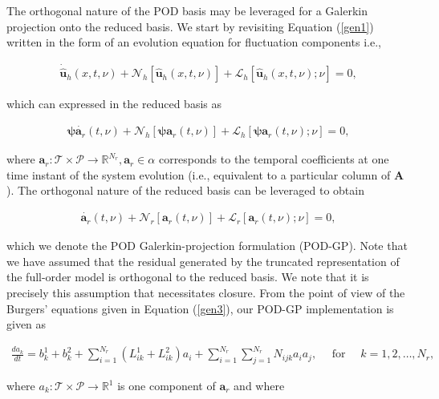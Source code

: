 \documentclass[preprint,12pt]{elsarticle}
\begin{document}
The orthogonal nature of the POD basis may be leveraged for a Galerkin projection onto the reduced basis. We start by revisiting Equation (\ref{gen1}) written in the form of an evolution equation for fluctuation components i.e.,
\begin{linenomath*}
\begin{align}
\dot{\hat{\mathbf{u}}}_h(x,t,\nu) + \mathcal{N}_h[\hat{\mathbf{u}}_h(x,t,\nu)] + \mathcal{L}_h[\hat{\mathbf{u}}_h(x,t,\nu); \nu] = 0,
\end{align}
\end{linenomath*}
which can expressed in the reduced basis as 
\begin{linenomath*}
\begin{align}
\boldsymbol{\psi} \dot{\mathbf{a}_r}(t,\nu) + \mathcal{N}_h[\boldsymbol{\psi} \mathbf{a}_r(t,\nu)] + \mathcal{L}_h[\boldsymbol{\psi} \mathbf{a}_r(t,\nu); \nu] = 0,
\end{align}
\end{linenomath*}
where $\mathbf{a}_r : \mathcal{T} \times \mathcal{P} \rightarrow \mathbb{R}^{N_r}, \mathbf{a}_r  \in \alpha$ corresponds to the temporal coefficients at one time instant of the system evolution (i.e., equivalent to a particular column of $\mathbf{A}$). The orthogonal nature of the reduced basis can be leveraged to obtain
\begin{linenomath*}
\begin{align}
\dot{\mathbf{a}_r}(t,\nu) + \mathcal{N}_r[\mathbf{a}_r(t,\nu)] + \mathcal{L}_r[\mathbf{a}_r(t,\nu); \nu] = 0,
\end{align}
\end{linenomath*}
which we denote the POD Galerkin-projection formulation (POD-GP). Note that we have assumed that the residual generated by the truncated representation of the full-order model is orthogonal to the reduced basis. We note that it is precisely this assumption that necessitates closure. From the point of view of the Burgers' equations given in Equation (\ref{gen3}), our POD-GP implementation is given as 
\begin{linenomath*}
\begin{align}
\frac{d a_{k}}{d t}=b_{k}^{1}+b_{k}^{2}+\sum_{i=1}^{N_r}\left(L_{i k}^{1}+L_{i k}^{2}\right) a_{i}+\sum_{i=1}^{N_r} \sum_{j=1}^{N_r} N_{i j k} a_{i} a_{j}, \quad \text { for } \quad k=1,2, \ldots, N_r,
\end{align}
\end{linenomath*}
where $a_k : \mathcal{T} \times \mathcal{P} \rightarrow \mathbb{R}^{1}$ is one component of $\mathbf{a}_r$ and where
\end{document}
